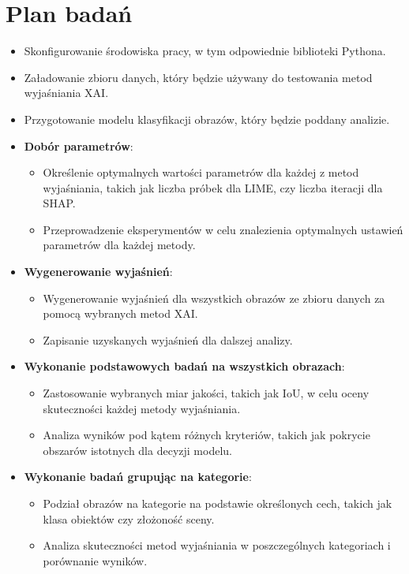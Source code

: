 \section*{Plan badań}

\begin{itemize}
	\item Skonfigurowanie środowiska pracy, w tym odpowiednie biblioteki Pythona.
	\item Załadowanie zbioru danych, który będzie używany do testowania metod wyjaśniania XAI.
	\item Przygotowanie modelu klasyfikacji obrazów, który będzie poddany analizie.
	\item \textbf{Dobór parametrów}:
	      \begin{itemize}
		      \item Określenie optymalnych wartości parametrów dla każdej z metod wyjaśniania, takich jak liczba próbek dla LIME, czy liczba iteracji dla SHAP.
		      \item Przeprowadzenie eksperymentów w celu znalezienia optymalnych ustawień parametrów dla każdej metody.
	      \end{itemize}

	\item \textbf{Wygenerowanie wyjaśnień}:
	      \begin{itemize}
		      \item Wygenerowanie wyjaśnień dla wszystkich obrazów ze zbioru danych za pomocą wybranych metod XAI.
		      \item Zapisanie uzyskanych wyjaśnień dla dalszej analizy.
	      \end{itemize}

	\item \textbf{Wykonanie podstawowych badań na wszystkich obrazach}:
	      \begin{itemize}
		      \item Zastosowanie wybranych miar jakości, takich jak IoU, w celu oceny skuteczności każdej metody wyjaśniania.
		      \item Analiza wyników pod kątem różnych kryteriów, takich jak pokrycie obszarów istotnych dla decyzji modelu.
	      \end{itemize}

	\item \textbf{Wykonanie badań grupując na kategorie}:
	      \begin{itemize}
		      \item Podział obrazów na kategorie na podstawie określonych cech, takich jak klasa obiektów czy złożoność sceny.
		      \item Analiza skuteczności metod wyjaśniania w poszczególnych kategoriach i porównanie wyników.
	      \end{itemize}


\end{itemize}

